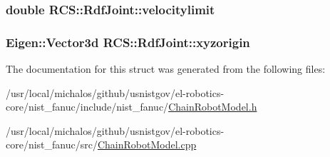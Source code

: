 \hypertarget{structRCS_1_1RdfJoint_a3419ee3cf55c8d8dd88fa7277a4dae12}{
\subsubsection[{velocitylimit}]{\setlength{\rightskip}{0pt plus 5cm}double R\-C\-S\-::\-Rdf\-Joint\-::velocitylimit}}\label{structRCS_1_1RdfJoint_a3419ee3cf55c8d8dd88fa7277a4dae12}
\hypertarget{structRCS_1_1RdfJoint_a37bb255f0c5c5bca1b6b64ff86e52aa6}{
\subsubsection[{xyzorigin}]{\setlength{\rightskip}{0pt plus 5cm}Eigen\-::\-Vector3d R\-C\-S\-::\-Rdf\-Joint\-::xyzorigin}}\label{structRCS_1_1RdfJoint_a37bb255f0c5c5bca1b6b64ff86e52aa6}


The documentation for this struct was generated from the following files\-:\begin{DoxyCompactItemize}
\item 
/usr/local/michalos/github/usnistgov/el-\/robotics-\/core/nist\-\_\-fanuc/include/nist\-\_\-fanuc/\hyperlink{ChainRobotModel_8h}{Chain\-Robot\-Model.\-h}\item 
/usr/local/michalos/github/usnistgov/el-\/robotics-\/core/nist\-\_\-fanuc/src/\hyperlink{ChainRobotModel_8cpp}{Chain\-Robot\-Model.\-cpp}\end{DoxyCompactItemize}
